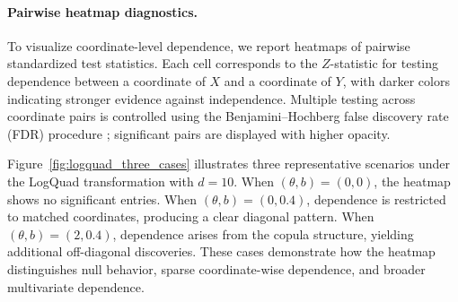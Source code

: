 \documentclass[12pt,reqno,oneside]{amsbook}
\theoremstyle{definition}
\theoremstyle{remark}
\begin{document}
\paragraph{Pairwise heatmap diagnostics.}
To visualize coordinate-level dependence, we report heatmaps of pairwise
standardized test statistics. Each cell corresponds to the $Z$-statistic for
testing dependence between a coordinate of $X$ and a coordinate of $Y$, with
darker colors indicating stronger evidence against independence. Multiple
testing across coordinate pairs is controlled using the
Benjamini--Hochberg false discovery rate (FDR) procedure
\cite{benjamini1995controlling}; significant pairs are displayed with higher
opacity.

Figure~\ref{fig:logquad_three_cases} illustrates three representative scenarios
under the LogQuad transformation with $d=10$. When $(\theta,b)=(0,0)$, the
heatmap shows no significant entries. When $(\theta,b)=(0,0.4)$, dependence is
restricted to matched coordinates, producing a clear diagonal pattern. When
$(\theta,b)=(2,0.4)$, dependence arises from the copula structure, yielding
additional off-diagonal discoveries. These cases demonstrate how the heatmap
distinguishes null behavior, sparse coordinate-wise dependence, and broader
multivariate dependence.
\end{document}
